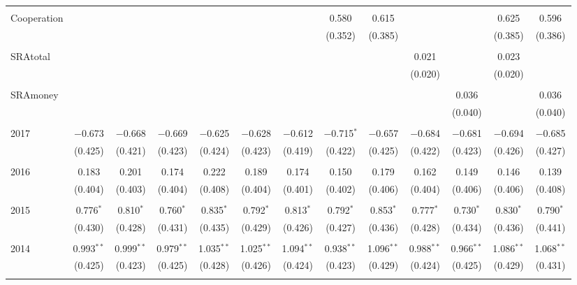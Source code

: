\begin{table}[H]
\begin{adjustbox}{width=\textwidth}
\begin{tabular}{@{\extracolsep{5pt}}lcccccccccccc}
  & & & & & & & & & & & & \\ 
 Cooperation &  &  &  &  &  &  & 0.580 & 0.615 &  &  & 0.625 & 0.596 \\ 
  &  &  &  &  &  &  & (0.352) & (0.385) &  &  & (0.385) & (0.386) \\ 
  & & & & & & & & & & & & \\ 
 SRAtotal &  &  &  &  &  &  &  &  & 0.021 &  & 0.023 &  \\ 
  &  &  &  &  &  &  &  &  & (0.020) &  & (0.020) &  \\ 
  & & & & & & & & & & & & \\ 
 SRAmoney &  &  &  &  &  &  &  &  &  & 0.036 &  & 0.036 \\ 
  &  &  &  &  &  &  &  &  &  & (0.040) &  & (0.040) \\ 
  & & & & & & & & & & & & \\ 
 2017 & $-$0.673 & $-$0.668 & $-$0.669 & $-$0.625 & $-$0.628 & $-$0.612 & $-$0.715$^{*}$ & $-$0.657 & $-$0.684 & $-$0.681 & $-$0.694 & $-$0.685 \\ 
  & (0.425) & (0.421) & (0.423) & (0.424) & (0.423) & (0.419) & (0.422) & (0.425) & (0.422) & (0.423) & (0.426) & (0.427) \\ 
  & & & & & & & & & & & & \\ 
 2016 & 0.183 & 0.201 & 0.174 & 0.222 & 0.189 & 0.174 & 0.150 & 0.179 & 0.162 & 0.149 & 0.146 & 0.139 \\ 
  & (0.404) & (0.403) & (0.404) & (0.408) & (0.404) & (0.401) & (0.402) & (0.406) & (0.404) & (0.406) & (0.406) & (0.408) \\ 
  & & & & & & & & & & & & \\ 
 2015 & 0.776$^{*}$ & 0.810$^{*}$ & 0.760$^{*}$ & 0.835$^{*}$ & 0.792$^{*}$ & 0.813$^{*}$ & 0.792$^{*}$ & 0.853$^{*}$ & 0.777$^{*}$ & 0.730$^{*}$ & 0.830$^{*}$ & 0.790$^{*}$ \\ 
  & (0.430) & (0.428) & (0.431) & (0.435) & (0.429) & (0.426) & (0.427) & (0.436) & (0.428) & (0.434) & (0.436) & (0.441) \\ 
  & & & & & & & & & & & & \\ 
 2014 & 0.993$^{**}$ & 0.999$^{**}$ & 0.979$^{**}$ & 1.035$^{**}$ & 1.025$^{**}$ & 1.094$^{**}$ & 0.938$^{**}$ & 1.096$^{**}$ & 0.988$^{**}$ & 0.966$^{**}$ & 1.086$^{**}$ & 1.068$^{**}$ \\ 
  & (0.425) & (0.423) & (0.425) & (0.428) & (0.426) & (0.424) & (0.423) & (0.429) & (0.424) & (0.425) & (0.429) & (0.431) \\ 
  & & & & & & & & & & & & \\ 

\end{tabular}
\end{adjustbox}
\end{table}
